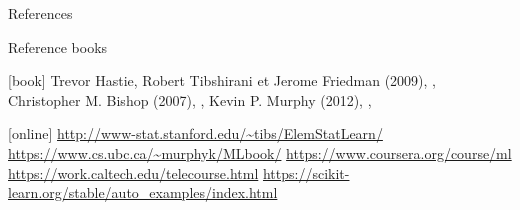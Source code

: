 \documentclass[pressentation,9pt,aspectratio=1610,xcolor=table]{beamer}
\begin{document}
\begin{frame}{References}
  \begin{block}{Reference books}
    \begin{thebibliography}{9}
      [book]
     Trevor Hastie, Robert Tibshirani et Jerome Friedman (2009), , \color{gray}{\it Springer Series in Statistics}
     Christopher M. Bishop (2007), , \color{gray}{\it Springer}
     Kevin P. Murphy (2012), , \color{gray}{\it MIT press}
    \end{thebibliography}
  \end{block}
  
  \begin{block}{}
    \begin{thebibliography}{9}
      [online]
     \url{http://www-stat.stanford.edu/~tibs/ElemStatLearn/}
     {\small \url{https://www.cs.ubc.ca/~murphyk/MLbook/} }
     \url{https://www.coursera.org/course/ml} \color{gray}{\scriptsize \it very popular MOOC (Andrew Ng)}
     \url{https://work.caltech.edu/telecourse.html} \color{gray}{\scriptsize \it more involved MOOC (Y. Abu-Mostafa)}
       \url{https://scikit-learn.org/stable/auto_examples/index.html} \color{gray}{\scriptsize \it Examples from the sklearn library}
    \end{thebibliography}
  \end{block}
\end{frame}
\end{document}
